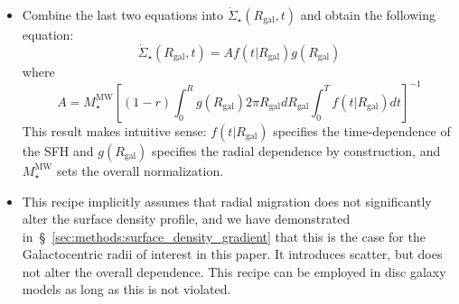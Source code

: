 \documentclass[fleqn, usenatbib]{mnras}
\begin{document}
\begin{appendices}
\begin{itemize}
	\item Combine the last two equations into 
	$\dot{\Sigma}_\star(R_\text{gal}, t)$ and obtain the following equation: 
	\begin{equation} 
	\dot{\Sigma}_\star(R_\text{gal}, t) = A f(t|R_\text{gal}) g(R_\text{gal}) 
	\end{equation} 
	where 
	\begin{equation} 
	A = M_\star^\text{MW}\left[(1 - r)\int_0^R g(R_\text{gal}) 2\pi 
		R_\text{gal} dR_\text{gal} \int_0^T f(t|R_\text{gal}) dt\right]^{-1} 
	\end{equation} 
	This result makes intuitive sense: $f(t|R_\text{gal})$ specifies the 
	time-dependence of the SFH and $g(R_\text{gal})$ specifies the radial 
	dependence by construction, and $M_\star^\text{MW}$ sets the overall 
	normalization. 

	\item This recipe implicitly assumes that radial migration does not 
	significantly alter the surface density profile, and we have demonstrated 
	in~\S~\ref{sec:methods:surface_density_gradient} that this is the case for 
	the Galactocentric radii of interest in this paper. It introduces scatter, 
	but does not alter the overall dependence. This recipe can be employed in 
	disc galaxy models as long as this is not violated. 
\end{itemize} 

\end{appendices} 

\newpage 
 
 

\label{lastpage} 
\end{document}
